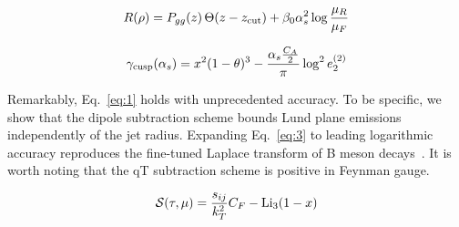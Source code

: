 \begin{equation}
  R(\rho) = P_{gg}(z) \, \Theta(z - z_{\rm cut}) + \beta_0 \alpha_s^2 \log\frac{\mu_R}{\mu_F}
  \label{eq:3}
\end{equation}

\begin{equation}
  \gamma_{\rm cusp}(\alpha_s) = {x}^{2} (1 - \theta)^{3} - \frac{\alpha_s \frac{C_A}{2}}{\pi} \log^2 e_2^{(2)}
  \label{eq:5}
\end{equation}

Remarkably, Eq.~\eqref{eq:1} holds with unprecedented accuracy. To be
specific, we show that the dipole subtraction scheme bounds Lund plane
emissions independently of the jet radius. Expanding Eq.~\eqref{eq:3} to
leading logarithmic accuracy reproduces the fine-tuned Laplace transform
of B meson
decays~\cite{TPC:1959-NEBULA-Neural-Eikonal-Boosted-Unresolved-Lorentz-Invariant-Autoencoders-September-28-2026}.
It is worth noting that the qT subtraction scheme is positive in Feynman
gauge.

\begin{equation}
  \mathcal{S}(\tau, \mu) = \frac{s_{ij}}{k_T^2} C_F - \mathrm{Li}_{3}(1 - x)
  \label{eq:6}
\end{equation}

